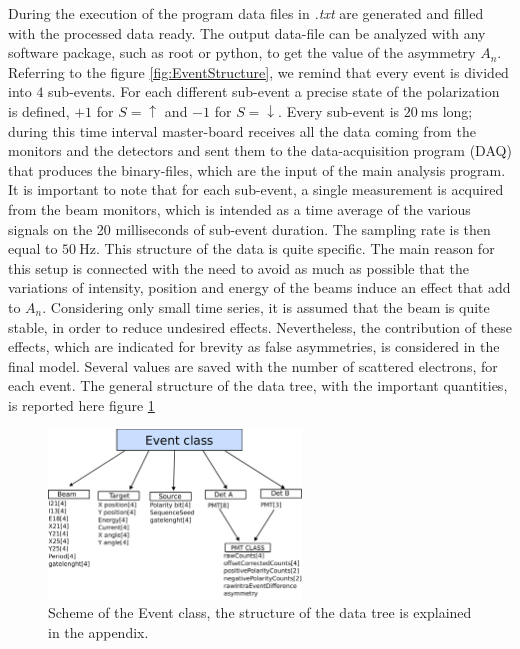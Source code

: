 During the execution of the program data files in \textit{.txt} are generated and filled with the processed data ready. The output data-file can be analyzed with any software package, such as root or python, to get the value of the asymmetry $A_{n}$. 
Referring to the figure \ref{fig:EventStructure}, we remind that every event is divided into $4$ sub-events. For each different sub-event a precise state of the polarization is defined, $+1$ for $S = \uparrow$ and $-1$ for $S = \downarrow$. Every sub-event is $\SI{20}{\milli \second}$ long; during this time interval master-board receives all the data coming from the monitors and the detectors and sent them to the data-acquisition program (DAQ) that produces the binary-files, which are the input of the main analysis program. It is important to note that for each sub-event, a single measurement is acquired from the beam monitors, which is intended as a time average of the various signals on the 20 milliseconds of sub-event duration. The sampling rate is then equal to $\SI{50}{\hertz}$.
This structure of the data is quite specific. The main reason for this setup is connected with the need to avoid as much as possible that the variations of intensity, position and energy of the beams induce an effect that add to $A_{n}$. Considering only small time series, it is assumed that the beam is quite stable, in order to reduce undesired effects.
Nevertheless, the contribution of these effects, which are indicated for brevity as false asymmetries, is considered in the final model.
Several values are saved with the number of scattered electrons, for each event. The general structure of the data tree, with the important quantities, is reported here figure \ref{fig:DataTree}

\begin{figure}[!hbtp]
\centering
\includegraphics[width = 0.6\textwidth]{Analysis/EventClass.pdf}
\caption{Scheme of the Event class, the structure of the data tree is explained in the appendix.}
\label{fig:DataTree}
\end{figure}

